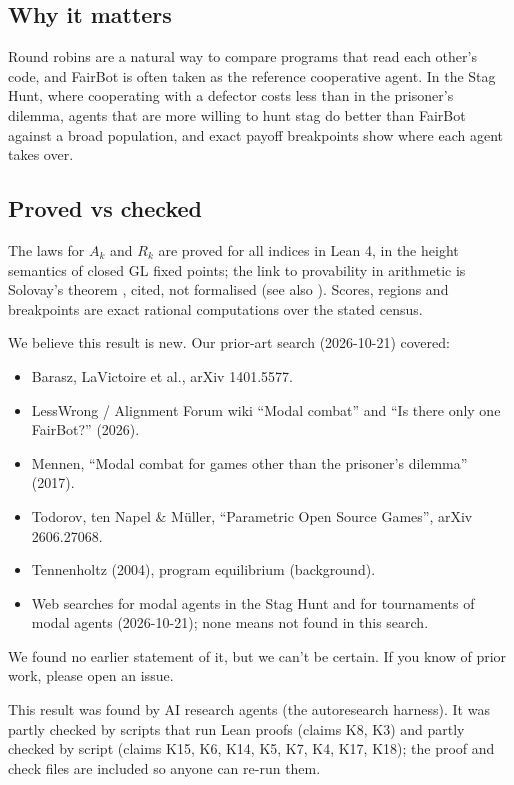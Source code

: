 \documentclass{article}
\begin{document}
\subsection*{Why it matters}

Round robins are a natural way to compare programs that read each other's code, and FairBot is
often taken as the reference cooperative agent. In the Stag Hunt, where cooperating with a
defector costs less than in the prisoner's dilemma, agents that are more willing to hunt stag do
better than FairBot against a broad population, and exact payoff breakpoints show where each
agent takes over.

\subsection*{Proved vs checked}

The laws for $A_k$ and $R_k$ are proved for all indices in Lean 4, in the height semantics of
closed GL fixed points; the link to provability in arithmetic is Solovay's theorem
\cite{solovay1976provability}, cited, not formalised (see also \cite{boolos1993logic}). Scores, regions
and breakpoints are exact rational computations over the stated census.

We believe this result is new. Our prior-art search (2026-10-21) covered:

\begin{itemize}
\item Barasz, LaVictoire et al., arXiv 1401.5577.
\item LessWrong / Alignment Forum wiki ``Modal combat'' and ``Is there only one FairBot?'' (2026).
\item Mennen, ``Modal combat for games other than the prisoner's dilemma'' (2017).
\item Todorov, ten Napel \& Müller, ``Parametric Open Source Games'', arXiv 2606.27068.
\item Tennenholtz (2004), program equilibrium (background).
\item Web searches for modal agents in the Stag Hunt and for tournaments of modal agents (2026-10-21); none means not found in this search.
\end{itemize}

We found no earlier statement of it, but we can't be certain. If you know of prior work, please open an issue.

This result was found by AI research agents (the autoresearch harness). It was partly checked by scripts that run Lean proofs (claims K8, K3) and partly checked by script (claims K15, K6, K14, K5, K7, K4, K17, K18); the proof and check files are included so anyone can re-run them.
\end{document}
